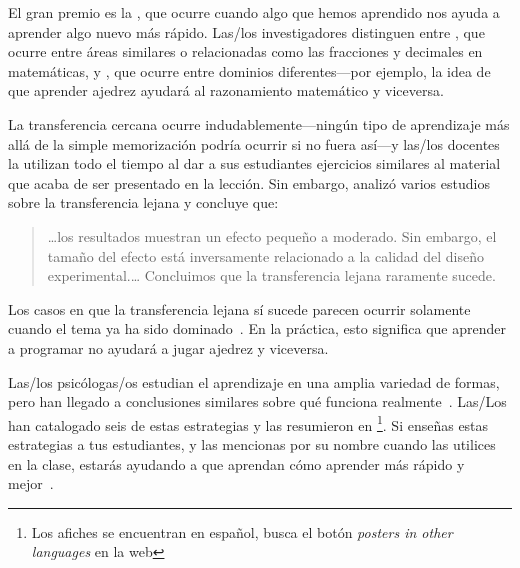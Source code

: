 El gran premio es la ,
que ocurre cuando algo que hemos aprendido nos ayuda a aprender algo nuevo más rápido.
Las/los investigadores distinguen entre ,
que ocurre entre áreas similares o relacionadas como las fracciones y decimales en matemáticas,
y ,
que ocurre entre dominios diferentes---por ejemplo,
la idea de que aprender ajedrez ayudará al razonamiento matemático y viceversa.

La transferencia cercana ocurre indudablemente---ningún tipo de aprendizaje
más allá de la simple memorización podría ocurrir si no fuera así---y
las/los docentes la utilizan todo el tiempo
al dar a sus estudiantes ejercicios similares al material que acaba de ser presentado en la lección.
Sin embargo,
\cite{Sala2017} analizó varios estudios sobre la transferencia lejana
y concluye que:

\begin{quote}

  {\ldots}los resultados muestran un efecto pequeño a moderado.
  Sin embargo, el tamaño del efecto está inversamente relacionado a la calidad del diseño experimental.{\ldots}
  Concluimos que la transferencia lejana raramente sucede.

\end{quote}

Los casos en que la transferencia lejana sí sucede
parecen ocurrir solamente cuando el tema ya ha sido dominado~\cite{Gick1987}.
En la práctica,
esto significa que aprender a programar no ayudará a jugar ajedrez y viceversa.


Las/los psicólogas/os estudian el aprendizaje en una amplia variedad de formas,
pero han llegado a conclusiones similares sobre qué funciona realmente~\cite{Mark2018}.
Las/Los 
han catalogado seis de estas estrategias y
las resumieron en \footnote{Los afiches se encuentran en español, busca el botón \emph{posters in other languages} en la web}.
Si enseñas estas estrategias a tus estudiantes,
y las mencionas por su nombre cuando las utilices en la clase,
estarás ayudando a que aprendan cómo aprender más rápido y mejor~\cite{Wein2018a,Wein2018b}.

